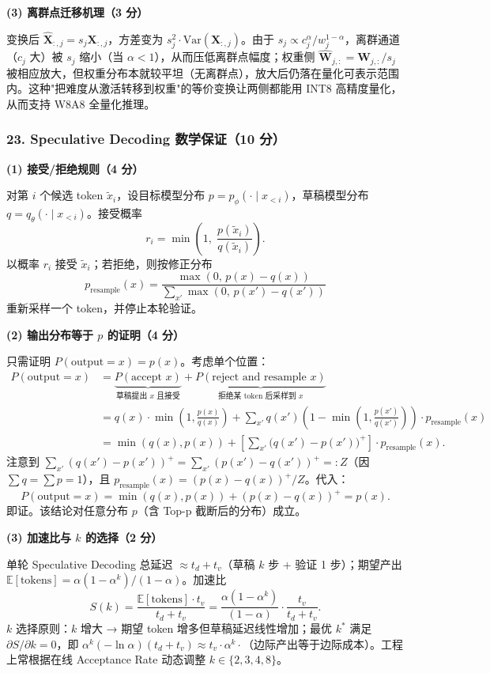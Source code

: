 \documentclass[11pt,a4paper]{article}
\begin{document}
\noindent\textbf{(3) 离群点迁移机理（3 分）}

变换后 $\widehat{\mathbf{X}}_{:,j} = s_j \mathbf{X}_{:,j}$，方差变为 $s_j^2 \cdot \mathrm{Var}(\mathbf{X}_{:,j})$。由于 $s_j\propto c_j^{\alpha}/w_j^{1-\alpha}$，离群通道（$c_j$ 大）被 $s_j$ 缩小（当 $\alpha<1$），从而压低离群点幅度；权重侧 $\widehat{\mathbf{W}}_{j,:}=\mathbf{W}_{j,:}/s_j$ 被相应放大，但权重分布本就较平坦（无离群点），放大后仍落在量化可表示范围内。这种"把难度从激活转移到权重"的等价变换让两侧都能用 INT8 高精度量化，从而支持 W8A8 全量化推理。

\subsubsection*{23. Speculative Decoding 数学保证（10 分）}

\noindent\textbf{(1) 接受/拒绝规则（4 分）}

对第 $i$ 个候选 token $\tilde{x}_i$，设目标模型分布 $p=p_\phi(\cdot\mid x_{<i})$，草稿模型分布 $q=q_\theta(\cdot\mid x_{<i})$。接受概率
\[
r_i = \min\!\left(1,\;\frac{p(\tilde{x}_i)}{q(\tilde{x}_i)}\right).
\]
以概率 $r_i$ 接受 $\tilde{x}_i$；若拒绝，则按修正分布
\[
p_{\text{resample}}(x) = \frac{\max(0,\, p(x)-q(x))}{\sum_{x'} \max(0,\, p(x')-q(x'))}
\]
重新采样一个 token，并停止本轮验证。

\noindent\textbf{(2) 输出分布等于 $p$ 的证明（4 分）}

只需证明 $P(\text{output}=x)=p(x)$。考虑单个位置：
\begin{align*}
P(\text{output}=x) &= \underbrace{P(\text{accept } x)}_{\text{草稿提出 }x\text{ 且接受}} + \underbrace{P(\text{reject and resample }x)}_{\text{拒绝某 token 后采样到 }x}\\
&= q(x)\cdot\min\!\left(1,\frac{p(x)}{q(x)}\right) + \sum_{x'} q(x')\!\left(1-\min\!\left(1,\frac{p(x')}{q(x')}\right)\right)\cdot p_{\text{resample}}(x)\\
&= \min(q(x), p(x)) + \left[\sum_{x'}\!\big(q(x')-p(x')\big)^{+}\right]\cdot p_{\text{resample}}(x).
\end{align*}
注意到 $\sum_{x'}(q(x')-p(x'))^{+} = \sum_{x'}(p(x')-q(x'))^{+}=:Z$（因 $\sum q=\sum p=1$），且 $p_{\text{resample}}(x)=(p(x)-q(x))^{+}/Z$。代入：
\[
P(\text{output}=x) = \min(q(x),p(x)) + (p(x)-q(x))^{+} = p(x).
\]
即证。该结论对任意分布 $p$（含 Top-p 截断后的分布）成立。

\noindent\textbf{(3) 加速比与 $k$ 的选择（2 分）}

单轮 Speculative Decoding 总延迟 $\approx t_d + t_v$（草稿 $k$ 步 + 验证 1 步）；期望产出 $\mathbb{E}[\text{tokens}]=\alpha(1-\alpha^k)/(1-\alpha)$。加速比
\[
S(k) = \frac{\mathbb{E}[\text{tokens}]\cdot t_v}{t_d+t_v} = \frac{\alpha(1-\alpha^k)}{(1-\alpha)}\cdot\frac{t_v}{t_d+t_v}.
\]
$k$ 选择原则：$k$ 增大 → 期望 token 增多但草稿延迟线性增加；最优 $k^\ast$ 满足 $\partial S/\partial k=0$，即 $\alpha^k(-\ln\alpha)(t_d+t_v) \approx t_v\cdot\alpha^k\cdot$（边际产出等于边际成本）。工程上常根据在线 Acceptance Rate 动态调整 $k\in\{2,3,4,8\}$。
\end{document}
